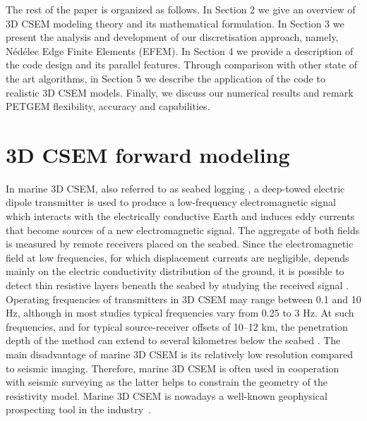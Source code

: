 \documentclass[review]{elsarticle}
\begin{document}
The rest of the paper is organized as follows. In Section 2 we give an overview of 3D CSEM modeling theory and its mathematical formulation. In Section 3 we present the analysis and development of our discretisation approach, namely, N\'ed\'elec Edge Finite Elements (EFEM). In Section 4 we provide a description of the code design and its parallel features. Through comparison with other state of the art algorithms, in Section 5 we describe the application of the code to realistic 3D CSEM models. Finally, we discuss our numerical results and remark PETGEM flexibility, accuracy and capabilities.

\section{3D CSEM forward modeling}
\label{Csem_fm}
In marine 3D CSEM, also referred to as seabed logging \citep{Eidesmo2002}, a deep-towed electric dipole transmitter is used to produce a low-frequency electromagnetic signal which interacts with the electrically conductive Earth and induces eddy currents that become sources of a new electromagnetic signal. The aggregate of both fields is measured by remote receivers placed on the seabed. Since the electromagnetic field at low frequencies, for which displacement currents are negligible, depends mainly on the electric conductivity distribution of the ground, it is possible to detect thin resistive layers beneath the seabed by studying the received signal \citep{Koldan2013}. Operating frequencies of transmitters in 3D CSEM may range between 0.1 and 10 Hz, although in most studies typical frequencies vary from 0.25 to 3 Hz. At such frequencies, and for typical source-receiver offsets of 10--12 km, the penetration depth of the method can extend to several kilometres below the seabed \citep{Hanif2011, Koldan2013}. The main disadvantage of marine 3D CSEM is its relatively low resolution compared to seismic imaging. Therefore, marine 3D CSEM is often used in cooperation with seismic surveying as the latter helps to constrain the geometry of the resistivity model. Marine 3D CSEM is nowadays a well-known geophysical prospecting tool in the industry~\citep[see, e.g., ][]{Constable2006,Boulaenko2007,Constable2007,Orange2009,Constable2010}. 
\end{document}
